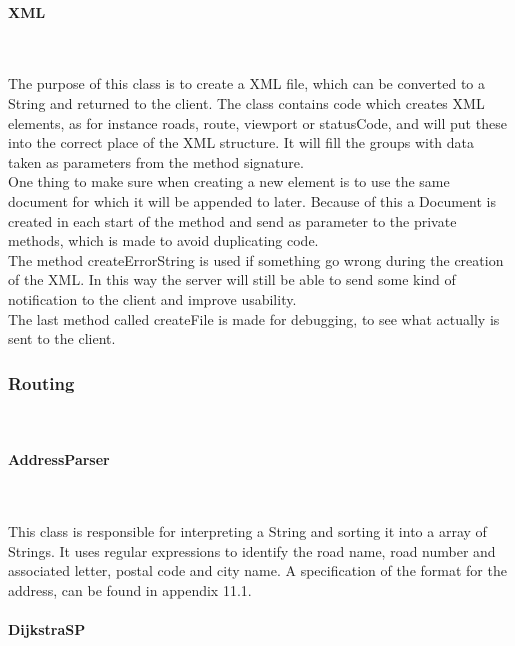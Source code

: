 \documentclass[a4paper,10pt,titlepage]{article}
\begin{document}
				
				\paragraph{XML}\mbox{}\
				
The purpose of this class is to create a XML file, which can be converted to a String and returned to the client. The class contains code which creates XML elements, as for instance roads, route, viewport or statusCode, and will put these into the correct place of the XML structure. It will fill the groups with data taken as parameters from the method signature. \\
One thing to make sure when creating a new element is to use the same document for which it will be appended to later. Because of this a Document is created in each start of the method and send as parameter to the private methods, which is made to avoid duplicating code.\\
The method createErrorString is used if something go wrong during the creation of the XML. In this way the server will still be able to send some kind of notification to the client and improve usability.\\
The last method called createFile is made for debugging, to see what actually is sent to the client.\\


				
			\subsubsection{Routing}\
			
				\paragraph{AddressParser}\mbox{}\
				
This class is responsible for interpreting a String and sorting it into a array of Strings. It uses regular expressions to identify the road name, road number and associated letter, postal code and city name. A specification of the format for the address, can be found in appendix 11.1.
				
				\paragraph{DijkstraSP \cite{sedgewickAndWayneDijkstraSP}}\mbox{}\
				
\end{document}
